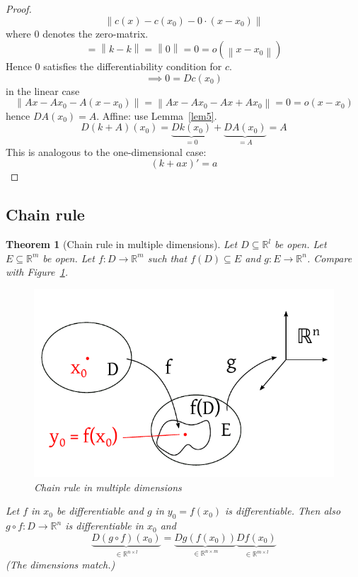 \documentclass{article}
\newtheorem{theorem}{Theorem}  \numberwithin{theorem}{section}
\newcommand{\norm}[1]{\left\|#1\right\|}
\begin{document}
\begin{proof}
  \[ \norm{c(x) - c(x_0) - 0 \cdot (x - x_0)} \]
  where $0$ denotes the zero-matrix.
  \[ = \norm{k - k} = \norm{0} = 0 = o(\norm{x - x_0}) \]
  Hence $0$ satisfies the differentiability condition for $c$.
  \[ \implies 0 = Dc(x_0) \]
  in the linear case
  \[ \norm{Ax - Ax_0 - A(x - x_0)} = \norm{Ax - Ax_0 - Ax + Ax_0} = 0 = o({x - x_0}) \]
  hence $DA(x_0) = A$.
  Affine: use Lemma~\ref{lem5}.
  \[ D(k + A)(x_0) = \underbrace{Dk(x_0)}_{=0} + \underbrace{DA(x_0)}_{= A} = A \]
  This is analogous to the one-dimensional case:
  \[ (k + ax)' = a \]
\end{proof}

\subsection{Chain rule}
\begin{theorem}[Chain rule in multiple dimensions]
  Let $D \subseteq \mathbb R^l$ be open. Let $E \subseteq \mathbb R^m$ be open.
  Let $f: D \to \mathbb R^m$ such that $f(D) \subseteq E$ and $g: E \to \mathbb R^n$.
  Compare with Figure~\ref{chainrule}.

  \begin{figure}[t]
    \begin{center}
      \includegraphics{img/30_fg.pdf}
      \caption{Chain rule in multiple dimensions}
      \label{chainrule}
    \end{center}
  \end{figure}

  Let $f$ in $x_0$ be differentiable and $g$ in $y_0 = f(x_0)$ is differentiable.
  Then also $g \circ f: D \to \mathbb R^n$ is differentiable in $x_0$ and
  \[ \underbrace{D(g \circ f)(x_0)}_{\in \mathbb R^{n \times l}} = \underbrace{Dg(f(x_0))}_{\in \mathbb R^{n \times m}} \underbrace{Df(x_0)}_{\in \mathbb R^{m \times l}} \]
  (The dimensions match.)
\end{theorem}
\end{document}
